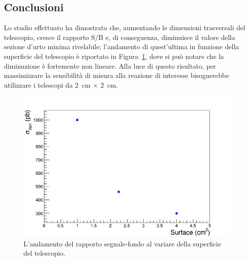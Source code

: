 \subsection*{Conclusioni}


Lo studio effettuato ha dimostrato che, aumentando le dimensioni trasversali del telescopio, cresce il rapporto S/B e, di conseguenza, diminuisce il valore della sezione d'urto minima rivelabile; l'andamento di quest'ultima in funzione della superficie del telescopio è riportato in Figura~\ref{fig:rapporto_segnale_fondo}, dove si può notare che la diminuzione è fortemente non lineare.
Alla luce di questo risultato, per massimizzare la sensibilità di misura alla reazione di interesse bisognerebbe utilizzare i telescopi da 2~cm $\times$ 2~cm.

\begin{figure} [!t]
	\centering
	\includegraphics[scale=0.5]{Grafici_Tesi2/Granularitanew/sigma_min.png}
	\caption{L'andamento del rapporto segnale-fondo al variare della superficie del telescopio.} \label{fig:rapporto_segnale_fondo}
\end{figure}

